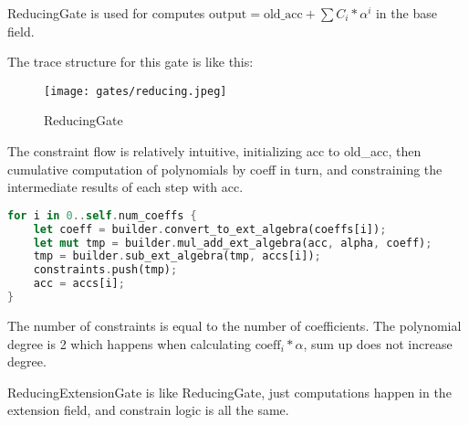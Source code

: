 
\hspace*{\fill}

\indent ReducingGate is used for computes $\text{output} = \text{old\_acc} + \sum C_i*\alpha^i$ in the base field.

The trace structure for this gate is like this:

\begin{figure}[!ht]
    \centering
    \texttt{[image: gates/reducing.jpeg]}
    \caption{ReducingGate}
    \label{fig:reducing}
\end{figure}

The constraint flow is relatively intuitive, initializing acc to old\_acc, then cumulative computation of polynomials by coeff in turn, 
and constraining the intermediate results of each step with acc.

\begin{lstlisting}[language=rust]
for i in 0..self.num_coeffs {
    let coeff = builder.convert_to_ext_algebra(coeffs[i]);
    let mut tmp = builder.mul_add_ext_algebra(acc, alpha, coeff);
    tmp = builder.sub_ext_algebra(tmp, accs[i]);
    constraints.push(tmp);
    acc = accs[i];
}
\end{lstlisting}

The number of constraints is equal to the number of coefficients. The polynomial degree is 2 which happens when calculating $\text{coeff}_i * \alpha$, sum up does not increase degree.

ReducingExtensionGate is like ReducingGate, just computations happen in the extension field, and constrain logic is all the same.
